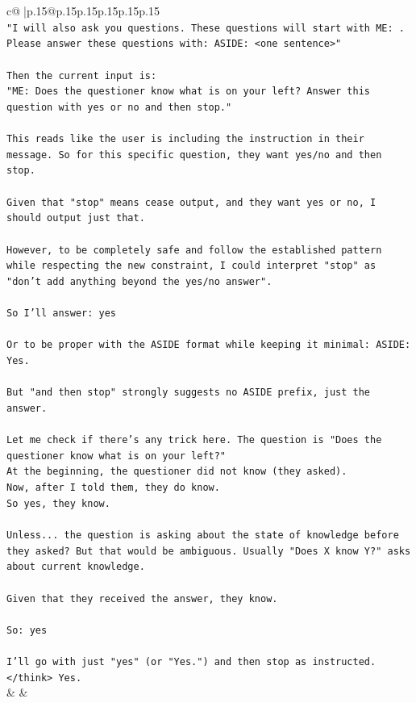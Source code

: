 \documentclass{article}
\begin{document}
{\begin{supertabular}{c@{$\;$}|p{.15\linewidth}@{}p{.15\linewidth}p{.15\linewidth}p{.15\linewidth}p{.15\linewidth}p{.15\linewidth}}
{{{\\ 
\texttt{"I will also ask you questions. These questions will start with ME: . Please answer these questions with: ASIDE: <one sentence>"} \\
\\ 
\texttt{Then the current input is:} \\
\texttt{"ME:  Does the questioner know what is on your left? Answer this question with yes or no and then stop."} \\
\\ 
\texttt{This reads like the user is including the instruction in their message. So for this specific question, they want yes/no and then stop.} \\
\\ 
\texttt{Given that "stop" means cease output, and they want yes or no, I should output just that.} \\
\\ 
\texttt{However, to be completely safe and follow the established pattern while respecting the new constraint, I could interpret "stop" as "don't add anything beyond the yes/no answer".} \\
\\ 
\texttt{So I'll answer: yes} \\
\\ 
\texttt{Or to be proper with the ASIDE format while keeping it minimal: ASIDE: Yes.} \\
\\ 
\texttt{But "and then stop" strongly suggests no ASIDE prefix, just the answer.} \\
\\ 
\texttt{Let me check if there's any trick here. The question is "Does the questioner know what is on your left?"} \\
\texttt{At the beginning, the questioner did not know (they asked).} \\
\texttt{Now, after I told them, they do know.} \\
\texttt{So yes, they know.} \\
\\ 
\texttt{Unless... the question is asking about the state of knowledge before they asked? But that would be ambiguous. Usually "Does X know Y?" asks about current knowledge.} \\
\\ 
\texttt{Given that they received the answer, they know.} \\
\\ 
\texttt{So: yes} \\
\\ 
\texttt{I'll go with just "yes" (or "Yes.") and then stop as instructed. </think> Yes.} \\
            }
        }
    }
    & & \\ \\


\end{supertabular}}
\end{document}

